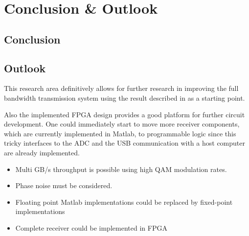 \chapter{Conclusion \& Outlook}
\section{Conclusion}



\section{Outlook}
This research area definitively allows for further research in improving
the full bandwidth transmission system using the result described in 
 as a starting point.

Also the implemented \gls{FPGA} design provides a good platform
for further circuit development. One could immediately start to
move more receiver components, which are currently implemented in Matlab,
to programmable logic since this tricky interfaces to the \gls{ADC}
and the \gls{USB} communication with a host computer are already implemented.





\begin{itemize}
\item Multi GB/s throughput is possible using high \gls{QAM} modulation rates.
\item Phase noise must be considered.
\item Floating point Matlab implementations could be replaced by fixed-point implementations
\item Complete receiver could be implemented in \gls{FPGA}
\end{itemize}


